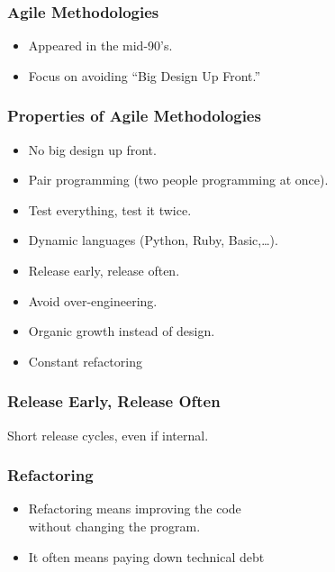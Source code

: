 \begin{frame}[fragile]
\frametitle{Agile Methodologies}

\begin{itemize}
\item Appeared in the mid-90's.
\item Focus on avoiding ``Big Design Up Front.''
\end{itemize}
\end{frame}

\begin{frame}[fragile]
\frametitle{Properties of Agile Methodologies}
\begin{itemize}
\item No big design up front.
\item Pair programming (two people programming at once). 
\item Test everything, test it twice.
\item Dynamic languages (Python, Ruby, Basic,\ldots).
\item Release early, release often.
\item Avoid over-engineering.
\item Organic growth instead of design.
\item Constant refactoring
\end{itemize}
\end{frame}

\begin{frame}[fragile]
\frametitle{Release Early, Release Often}

Short release cycles, even if internal.

\end{frame}

\begin{frame}[fragile]
\frametitle{Refactoring}

\begin{itemize}
\item Refactoring means \alert{improving the code}\\
    without \alert{changing the program}.
\item It often means paying down \alert{technical debt}
\end{itemize}

\end{frame}



